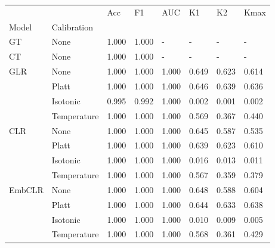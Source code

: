 \begin{tabular}{llllllll}
\toprule
 &  & Acc & F1 & AUC & K1 & K2 & Kmax \\
Model & Calibration &  &  &  &  &  &  \\
\midrule
GT & None & 1.000 & 1.000 & - & - & - & - \\
\cline{1-8}
CT & None & 1.000 & 1.000 & - & - & - & - \\
\cline{1-8}
\multirow[t]{4}{*}{GLR} & None & 1.000 & 1.000 & 1.000 & 0.649 & 0.623 & 0.614 \\
 & Platt & 1.000 & 1.000 & 1.000 & 0.646 & 0.639 & 0.636 \\
 & Isotonic & 0.995 & 0.992 & 1.000 & 0.002 & 0.001 & 0.002 \\
 & Temperature & 1.000 & 1.000 & 1.000 & 0.569 & 0.367 & 0.440 \\
\cline{1-8}
\multirow[t]{4}{*}{CLR} & None & 1.000 & 1.000 & 1.000 & 0.645 & 0.587 & 0.535 \\
 & Platt & 1.000 & 1.000 & 1.000 & 0.639 & 0.623 & 0.610 \\
 & Isotonic & 1.000 & 1.000 & 1.000 & 0.016 & 0.013 & 0.011 \\
 & Temperature & 1.000 & 1.000 & 1.000 & 0.567 & 0.359 & 0.379 \\
\cline{1-8}
\multirow[t]{4}{*}{EmbCLR} & None & 1.000 & 1.000 & 1.000 & 0.648 & 0.588 & 0.604 \\
 & Platt & 1.000 & 1.000 & 1.000 & 0.644 & 0.633 & 0.638 \\
 & Isotonic & 1.000 & 1.000 & 1.000 & 0.010 & 0.009 & 0.005 \\
 & Temperature & 1.000 & 1.000 & 1.000 & 0.568 & 0.361 & 0.429 \\
\cline{1-8}
\bottomrule
\end{tabular}
